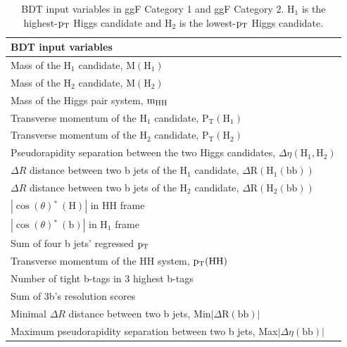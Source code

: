 \begin{table}[htbp!]
\caption[BDT input variables in ggF Category 1 and ggF Category 2]{\label{strategy:bdtinputs}BDT input variables in ggF Category 1 and ggF Category 2. $\mathrm{H_{1}}$ is the highest-$\mathrm{p_{T}}$ Higgs candidate and $\mathrm{H_{2}}$ is the lowest-$\mathrm{p_{T}}$ Higgs candidate.}
\centering
\begin{tabularx}{\textwidth}{X}
    \hline
    BDT input variables                          \\    
    \hline
    Mass of the $\mathrm{H_{1}}$ candidate, $\mathrm{M(H_{1})}$ \\
    Mass of the $\mathrm{H_{2}}$ candidate, $\mathrm{M(H_{2})}$  \\
    Mass of the Higgs pair system, $\mathrm{m_{HH}}$  \\
    Transverse momentum of the $\mathrm{H_{1}}$ candidate, $\mathrm{P_{T}(H_{1})}$ \\
    Transverse momentum of the $\mathrm{H_{2}}$ candidate, $\mathrm{P_{T}(H_{2})}$ \\
    Pseudorapidity separation between the two Higgs candidates, $\Delta\eta\mathrm{(H_1,H_2)}$              \\   
    $\Delta R$ distance between two b jets of the $\mathrm{H_{1}}$ candidate, $\Delta\mathrm{R(H_{1}(bb))}$ \\
    $\Delta R$ distance between two b jets of the $\mathrm{H_{2}}$ candidate, $\Delta\mathrm{R(H_{2}(bb))}$ \\
    $|\mathrm{\cos}(\theta)\mathrm{^{*}~(H)}|$ in HH frame                               \\      
    $|\mathrm{\cos}(\theta)\mathrm{^{*}~(b)}|$ in $\mathrm{H_{1}}$ frame                 \\
    Sum of four b jets' regressed $\mathrm{p_{T}}$                                                  \\
    Transverse momentum of the HH system, $\mathrm{\mathrm{p_{T}}(HH)}$                             \\
    Number of tight b-tags in 3 highest b-tags                                          \\
    Sum of 3b's resolution scores                                                        \\
    Minimal $\Delta R$ distance between two b jets, Min$|\Delta\mathrm{R(bb)}|$          \\
    Maximum pseudorapidity separation between two b jets, Max$|\Delta\eta\mathrm{(bb)}|$ \\
    \hline
\end{tabularx}
\end{table}

